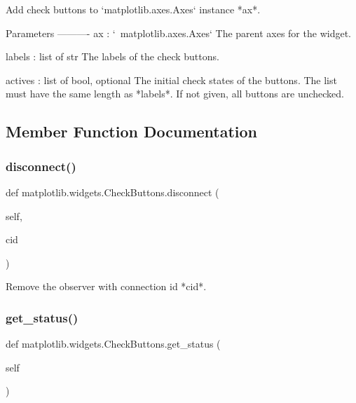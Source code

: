 \begin{DoxyVerb}Add check buttons to `matplotlib.axes.Axes` instance *ax*.

Parameters
----------
ax : `~matplotlib.axes.Axes`
    The parent axes for the widget.

labels : list of str
    The labels of the check buttons.

actives : list of bool, optional
    The initial check states of the buttons. The list must have the
    same length as *labels*. If not given, all buttons are unchecked.
\end{DoxyVerb}
 

\subsection{Member Function Documentation}
\mbox{\label{classmatplotlib_1_1widgets_1_1CheckButtons_a17c09771d95c7842999dfaa6f296127c}} 
\subsubsection{\texorpdfstring{disconnect()}{disconnect()}}
{\footnotesize\ttfamily def matplotlib.\+widgets.\+Check\+Buttons.\+disconnect (\begin{DoxyParamCaption}\item[{}]{self,  }\item[{}]{cid }\end{DoxyParamCaption})}

\begin{DoxyVerb}Remove the observer with connection id *cid*.\end{DoxyVerb}
 \mbox{\label{classmatplotlib_1_1widgets_1_1CheckButtons_a19e5321e6e1910bcfbb11538a0d979b4}} 
\subsubsection{\texorpdfstring{get\+\_\+status()}{get\_status()}}
{\footnotesize\ttfamily def matplotlib.\+widgets.\+Check\+Buttons.\+get\+\_\+status (\begin{DoxyParamCaption}\item[{}]{self }\end{DoxyParamCaption})}

